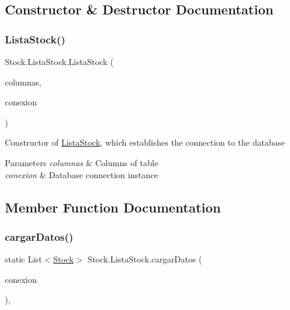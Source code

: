 \subsection{Constructor \& Destructor Documentation}
\mbox{\label{class_stock_1_1_lista_stock_a21df0fe48a39fb1aac80a2ca7fb67c0a}} 
\subsubsection{\texorpdfstring{Lista\+Stock()}{ListaStock()}}
{\footnotesize\ttfamily Stock.\+Lista\+Stock.\+Lista\+Stock (\begin{DoxyParamCaption}\item[{\mbox{\hyperlink{class_stock_1_1_modelo_columnas_tabla_stock}{Modelo\+Columnas\+Tabla\+Stock}}}]{columnas,  }\item[{\mbox{\hyperlink{classconexion_s_q_l_1_1_my_data_access}{My\+Data\+Access}}}]{conexion }\end{DoxyParamCaption})\hspace{0.3cm}{\ttfamily [inline]}}

Constructor of \mbox{\hyperlink{class_stock_1_1_lista_stock}{Lista\+Stock}}, which establishes the connection to the database 
\begin{DoxyParams}{Parameters}
{\em columnas} & Columns of table \\
\hline
{\em conexion} & Database connection instance \\
\hline
\end{DoxyParams}


\subsection{Member Function Documentation}
\mbox{\label{class_stock_1_1_lista_stock_ae43d6e1304e10935ed275f770f6fd743}} 
\subsubsection{\texorpdfstring{cargar\+Datos()}{cargarDatos()}}
{\footnotesize\ttfamily static List$<$\mbox{\hyperlink{class_stock_1_1_stock}{Stock}}$>$ Stock.\+Lista\+Stock.\+cargar\+Datos (\begin{DoxyParamCaption}\item[{\mbox{\hyperlink{classconexion_s_q_l_1_1_my_data_access}{My\+Data\+Access}}}]{conexion }\end{DoxyParamCaption})\hspace{0.3cm}{\ttfamily [inline]}, {\ttfamily [static]}}

